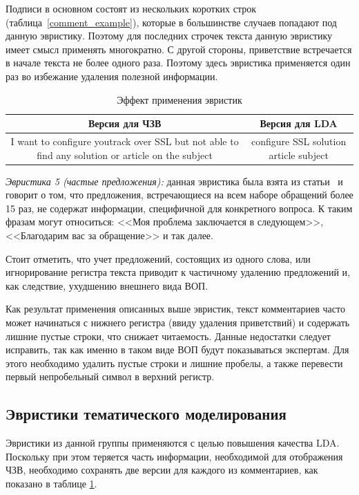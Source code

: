 Подписи в основном состоят из нескольких коротких строк (таблица~\ref{comment_example}), которые в большинстве случаев попадают под данную эвристику. Поэтому для последних строчек текста данную эвристику имеет смысл применять многократно. С другой стороны, приветствие встречается в начале текста не более одного раза. Поэтому здесь эвристика применяется один раз во избежание удаления полезной информации.

\begin{table}[!ht]
\caption{Эффект применения эвристик}
\label{heuristics_table}
\centering
\begin{tabular}{|c|c|}
\hline
Версия для ЧЗВ & Версия для LDA \\
\hline
\parbox[t]{4cm}{I want to configure youtrack over SSL but
not able to find any solution or article on the subject} & \parbox[t]{4cm}{configure SSL solution article subject}\\
\hline
\end{tabular}
\end{table}

\textit{Эвристика 5 (частые предложения):} данная эвристика была взята из статьи~\cite{original} и говорит о том, что предложения, встречающиеся на всем наборе обращений более 15 раз, не содержат информации, специфичной для конкретного вопроса. К таким фразам могут относиться: <<Моя проблема заключается в следующем>>, <<Благодарим вас за обращение>> и так далее.

Стоит отметить, что учет предложений, состоящих из одного слова, или игнорирование регистра текста приводит к частичному удалению предложений и, как следствие, ухудшению внешнего вида ВОП.

Как результат применения описанных выше эвристик, текст комментариев часто может начинаться с нижнего регистра (ввиду удаления приветствий) и содержать лишние пустые строки, что снижает читаемость. Данные недостатки следует исправить, так как именно в таком виде ВОП будут показываться экспертам. Для этого необходимо удалить пустые строки и лишние пробелы, а также перевести первый непробельный символ в верхний регистр.

\subsection{Эвристики тематического моделирования}
\label{subsec:ldaheur}

Эвристики из данной группы применяются с целью повышения качества LDA. Поскольку при этом теряется часть информации, необходимой для отображения ЧЗВ, необходимо сохранять две версии для каждого из комментариев, как показано в таблице \ref{heuristics_table}.

